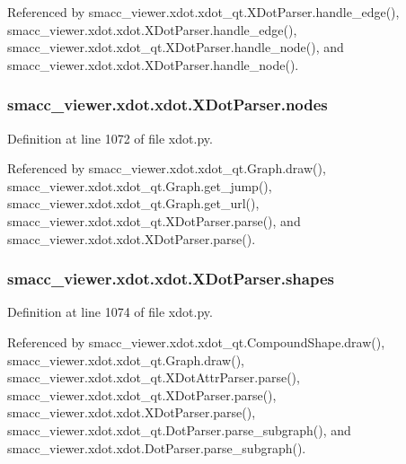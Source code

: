Referenced by smacc\+\_\+viewer.\+xdot.\+xdot\+\_\+qt.\+X\+Dot\+Parser.\+handle\+\_\+edge(), smacc\+\_\+viewer.\+xdot.\+xdot.\+X\+Dot\+Parser.\+handle\+\_\+edge(), smacc\+\_\+viewer.\+xdot.\+xdot\+\_\+qt.\+X\+Dot\+Parser.\+handle\+\_\+node(), and smacc\+\_\+viewer.\+xdot.\+xdot.\+X\+Dot\+Parser.\+handle\+\_\+node().

\subsubsection[{\texorpdfstring{nodes}{nodes}}]{\setlength{\rightskip}{0pt plus 5cm}smacc\+\_\+viewer.\+xdot.\+xdot.\+X\+Dot\+Parser.\+nodes}\hypertarget{classsmacc__viewer_1_1xdot_1_1xdot_1_1XDotParser_abe817aefceb772f9c874fc46049d6cf4}{}\label{classsmacc__viewer_1_1xdot_1_1xdot_1_1XDotParser_abe817aefceb772f9c874fc46049d6cf4}


Definition at line 1072 of file xdot.\+py.



Referenced by smacc\+\_\+viewer.\+xdot.\+xdot\+\_\+qt.\+Graph.\+draw(), smacc\+\_\+viewer.\+xdot.\+xdot\+\_\+qt.\+Graph.\+get\+\_\+jump(), smacc\+\_\+viewer.\+xdot.\+xdot\+\_\+qt.\+Graph.\+get\+\_\+url(), smacc\+\_\+viewer.\+xdot.\+xdot\+\_\+qt.\+X\+Dot\+Parser.\+parse(), and smacc\+\_\+viewer.\+xdot.\+xdot.\+X\+Dot\+Parser.\+parse().

\subsubsection[{\texorpdfstring{shapes}{shapes}}]{\setlength{\rightskip}{0pt plus 5cm}smacc\+\_\+viewer.\+xdot.\+xdot.\+X\+Dot\+Parser.\+shapes}\hypertarget{classsmacc__viewer_1_1xdot_1_1xdot_1_1XDotParser_a768f7f940ba60d62b1913c212987f5ef}{}\label{classsmacc__viewer_1_1xdot_1_1xdot_1_1XDotParser_a768f7f940ba60d62b1913c212987f5ef}


Definition at line 1074 of file xdot.\+py.



Referenced by smacc\+\_\+viewer.\+xdot.\+xdot\+\_\+qt.\+Compound\+Shape.\+draw(), smacc\+\_\+viewer.\+xdot.\+xdot\+\_\+qt.\+Graph.\+draw(), smacc\+\_\+viewer.\+xdot.\+xdot\+\_\+qt.\+X\+Dot\+Attr\+Parser.\+parse(), smacc\+\_\+viewer.\+xdot.\+xdot\+\_\+qt.\+X\+Dot\+Parser.\+parse(), smacc\+\_\+viewer.\+xdot.\+xdot.\+X\+Dot\+Parser.\+parse(), smacc\+\_\+viewer.\+xdot.\+xdot\+\_\+qt.\+Dot\+Parser.\+parse\+\_\+subgraph(), and smacc\+\_\+viewer.\+xdot.\+xdot.\+Dot\+Parser.\+parse\+\_\+subgraph().

